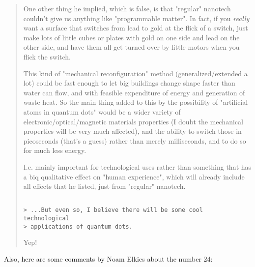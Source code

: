 \begin{quote}
One other thing he implied, which is false, is that "regular" nanotech
couldn't give us anything like "programmable matter". In fact, if you
\emph{really} want a surface that switches from lead to gold at the flick
of a switch, just make lots of little cubes or plates with gold on one side
and lead on the other side, and have them all get turned over by little
motors when you flick the switch.

This kind of "mechanical reconfiguration" method (generalized/extended a
lot) could be fast enough to let big buildings change shape faster than
water can flow, and with feasible expenditure of energy and generation
of waste heat. So the main thing added to this by the possibility of
"artificial atoms in quantum dots" would be a wider variety of
electronic/optical/magnetic materials properties (I doubt the mechanical
properties will be very much affected), and the ability to switch those
in picoseconds (that's a guess) rather than merely milliseconds, and to
do so for much less energy.

I.e. mainly important for technological uses rather than something
that has a biq qualitative effect on "human experience", which will
already include all effects that he listed, just from "regular" nanotech.

\begin{verbatim}

> ...But even so, I believe there will be some cool technological 
> applications of quantum dots.
\end{verbatim}
    
Yep!
\end{quote}

Also, here are some comments by Noam Elkies about the number 24:

